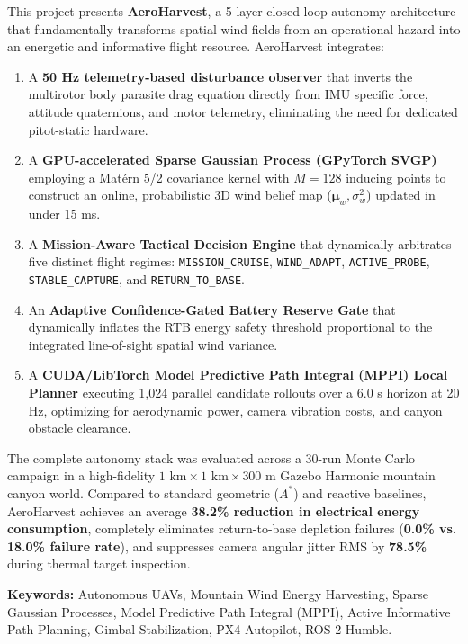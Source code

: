 \documentclass[12pt,a4paper,oneside]{report}
\begin{document}
This project presents \textbf{AeroHarvest}, a 5-layer closed-loop autonomy architecture that fundamentally transforms spatial wind fields from an operational hazard into an energetic and informative flight resource. AeroHarvest integrates:
\begin{enumerate}
    \item A \textbf{50 Hz telemetry-based disturbance observer} that inverts the multirotor body parasite drag equation directly from IMU specific force, attitude quaternions, and motor telemetry, eliminating the need for dedicated pitot-static hardware.
    \item A \textbf{GPU-accelerated Sparse Gaussian Process (GPyTorch SVGP)} employing a Mat\'ern 5/2 covariance kernel with $M = 128$ inducing points to construct an online, probabilistic 3D wind belief map ($\boldsymbol{\mu}_w, \sigma_w^2$) updated in under 15 ms.
    \item A \textbf{Mission-Aware Tactical Decision Engine} that dynamically arbitrates five distinct flight regimes: \texttt{MISSION\_CRUISE}, \texttt{WIND\_ADAPT}, \texttt{ACTIVE\_PROBE}, \texttt{STABLE\_CAPTURE}, and \texttt{RETURN\_TO\_BASE}.
    \item An \textbf{Adaptive Confidence-Gated Battery Reserve Gate} that dynamically inflates the RTB energy safety threshold proportional to the integrated line-of-sight spatial wind variance.
    \item A \textbf{CUDA/LibTorch Model Predictive Path Integral (MPPI) Local Planner} executing 1,024 parallel candidate rollouts over a 6.0 s horizon at 20 Hz, optimizing for aerodynamic power, camera vibration costs, and canyon obstacle clearance.
\end{enumerate}

The complete autonomy stack was evaluated across a 30-run Monte Carlo campaign in a high-fidelity $1\text{ km} \times 1\text{ km} \times 300\text{ m}$ Gazebo Harmonic mountain canyon world. Compared to standard geometric ($A^*$) and reactive baselines, AeroHarvest achieves an average \textbf{38.2\% reduction in electrical energy consumption}, completely eliminates return-to-base depletion failures (\textbf{0.0\% vs. 18.0\% failure rate}), and suppresses camera angular jitter RMS by \textbf{78.5\%} during thermal target inspection.

\vspace{6mm}
\noindent
\textbf{Keywords:} Autonomous UAVs, Mountain Wind Energy Harvesting, Sparse Gaussian Processes, Model Predictive Path Integral (MPPI), Active Informative Path Planning, Gimbal Stabilization, PX4 Autopilot, ROS 2 Humble.
\end{document}
